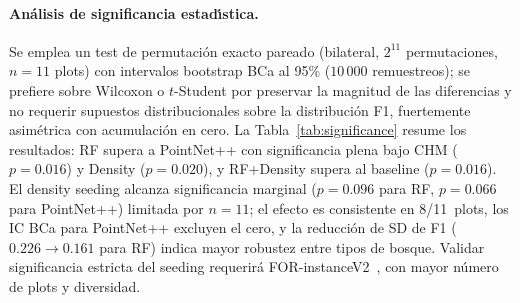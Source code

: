 \documentclass{cys}
\begin{document}
\paragraph{An\'alisis de significancia estad\'\i{}stica.}
Se emplea un test de permutaci\'on exacto pareado (bilateral, $2^{11}$ permutaciones, $n=11$ plots) con intervalos bootstrap BCa al 95\% ($10\,000$ remuestreos); se prefiere sobre Wilcoxon o $t$-Student por preservar la magnitud de las diferencias y no requerir supuestos distribucionales sobre la distribuci\'on F1, fuertemente asim\'etrica con acumulaci\'on en cero. La Tabla~\ref{tab:significance} resume los resultados: RF supera a PointNet++ con significancia plena bajo CHM ($p=0.016$) y Density ($p=0.020$), y RF+Density supera al baseline ($p=0.016$). El density seeding alcanza significancia marginal ($p=0.096$ para RF, $p=0.066$ para PointNet++) limitada por $n=11$; el efecto es consistente en 8/11~plots, los IC BCa para PointNet++ excluyen el cero, y la reducci\'on de SD de F1 ($0.226 \rightarrow 0.161$ para RF) indica mayor robustez entre tipos de bosque. Validar significancia estricta del seeding requerir\'a FOR-instanceV2~\cite{xiang2025}, con mayor n\'umero de plots y diversidad.

\begin{table}[H]
\centering
\caption{Test de permutaci\'on exacto pareado (bilateral, $2^{11}$ permutaciones, $n=11$ plots) e intervalos de confianza bootstrap BCa al 95\% para diferencias en F1 de instancia.}\label{tab:significance}
\end{table}
\end{document}

